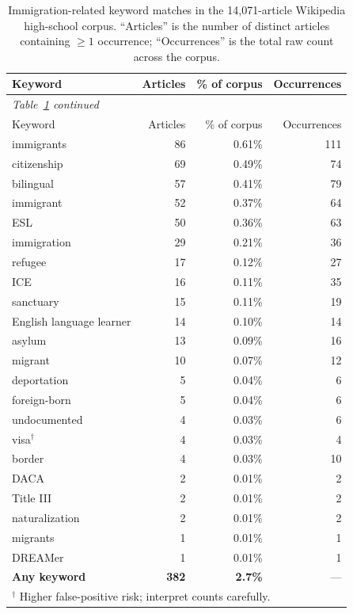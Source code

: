 \documentclass{article}
\begin{document}
\begin{longtable}{lrrr}
  \caption{Immigration-related keyword matches in the 14{,}071-article Wikipedia high-school corpus. ``Articles'' is the number of distinct articles containing $\geq 1$ occurrence; ``Occurrences'' is the total raw count across the corpus.}
  \label{tab:wiki_immigration_keywords} \\
  \toprule
  Keyword & Articles & \% of corpus & Occurrences \\
  \midrule
  \endfirsthead
  \multicolumn{4}{l}{\small\textit{Table~\ref{tab:wiki_immigration_keywords} continued}} \\[2pt]
  \toprule
  Keyword & Articles & \% of corpus & Occurrences \\
  \midrule
  \endhead
    immigrants               & 86  & 0.61\% & 111 \\
    citizenship              & 69  & 0.49\% &  74 \\
    bilingual                & 57  & 0.41\% &  79 \\
    immigrant                & 52  & 0.37\% &  64 \\
    ESL                      & 50  & 0.36\% &  63 \\
    immigration              & 29  & 0.21\% &  36 \\
    refugee                  & 17  & 0.12\% &  27 \\
    ICE                      & 16  & 0.11\% &  35 \\
    sanctuary                & 15  & 0.11\% &  19 \\
    English language learner & 14  & 0.10\% &  14 \\
    asylum                   & 13  & 0.09\% &  16 \\
    migrant                  & 10  & 0.07\% &  12 \\
    deportation              &  5  & 0.04\% &   6 \\
    foreign-born             &  5  & 0.04\% &   6 \\
    undocumented             &  4  & 0.03\% &   6 \\
    visa$^\dagger$           &  4  & 0.03\% &   4 \\
    border                   &  4  & 0.03\% &  10 \\
    DACA                     &  2  & 0.01\% &   2 \\
    Title III                &  2  & 0.01\% &   2 \\
    naturalization           &  2  & 0.01\% &   2 \\
    migrants                 &  1  & 0.01\% &   1 \\
    DREAMer                  &  1  & 0.01\% &   1 \\
    \midrule
    \textbf{Any keyword}     & \textbf{382} & \textbf{2.7\%} & --- \\
    \bottomrule
    \multicolumn{4}{l}{\footnotesize $^\dagger$ Higher false-positive risk; interpret counts carefully.} \\
\end{longtable}
\end{document}
